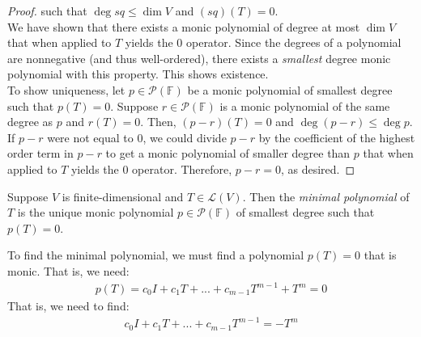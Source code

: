 \documentclass{article}
\begin{document}
\begin{proof}
  such that $\deg sq \le \dim V$ and $(sq)(T) = 0$. \\
  We have shown that there exists a monic polynomial of degree at most
  $\dim V$ that when applied to $T$ yields the $0$ operator. Since the
  degrees of a polynomial are nonnegative (and thus well-ordered),
  there exists a \textit{smallest} degree monic polynomial with this
  property. This shows existence. \\
  To show uniqueness, let $p \in \mathcal{P}(\mathbb{F})$ be a monic
  polynomial of smallest degree such that $p(T) = 0$. Suppose $r \in
  \mathcal{P}(\mathbb{F})$ is a monic polynomial of the same degree as
  $p$ and $r(T) = 0$. Then, $(p - r)(T) = 0$ and $\deg (p - r) \le
  \deg p$. If $p - r$ were not equal to $0$, we could divide $p - r$
  by the coefficient of the highest order term in $p - r$ to get a
  monic polynomial of smaller degree than $p$ that when applied to $T$
  yields the $0$ operator. Therefore, $p - r = 0$, as desired.
\end{proof}

\begin{definition}
  \label{def:minimal-polynomial}
  Suppose $V$ is finite-dimensional and $T \in \mathcal{L}(V)$. Then
  the \textit{minimal polynomial} of $T$ is the unique monic
  polynomial $p \in \mathcal{P}(\mathbb{F})$ of smallest degree such
  that $p(T) = 0$.
\end{definition}

\begin{remark}
  To find the minimal polynomial, we must find a polynomial $p(T) = 0$
  that is monic. That is, we need:
  \begin{align*}
    p(T) = c_0 I + c_1 T + ... + c_{m-1}T^{m-1} + T^m = 0
  \end{align*}
  That is, we need to find:
  \begin{align*}
    c_0 I + c_1 T + ... + c_{m-1}T^{m-1} = -T^m
  \end{align*}
\end{remark}
\end{document}
